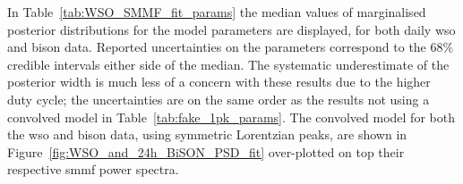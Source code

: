 In Table~\ref{tab:WSO_SMMF_fit_params} the median values of marginalised posterior distributions for the model parameters are displayed, for both daily \gls{wso} and \gls{bison} data. Reported uncertainties on the parameters correspond to the $68 \%$ credible intervals either side of the median. The systematic underestimate of the posterior width is much less of a concern with these results due to the higher duty cycle; the uncertainties are on the same order as the results not using a convolved model in Table~\ref{tab:fake_1pk_params}. The convolved model for both the \gls{wso} and \gls{bison} data, using symmetric Lorentzian peaks, are shown in Figure~\ref{fig:WSO_and_24h_BiSON_PSD_fit} over-plotted on top their respective \gls{smmf} power spectra.

%			
%			
%			
%			
%			
%			
%			
%			
%			


